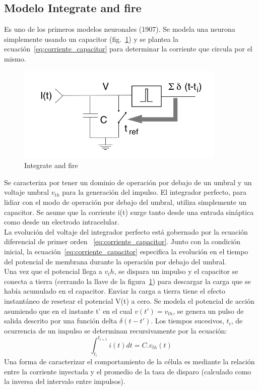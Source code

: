 \subsection{Modelo Integrate and fire}
Es uno de los primeros modelos neuronales (1907). Se modela una neurona simplemente usando un capacitor (fig.~\ref{fig:integrate_and_fire}) y se plantea la ecuación~\ref{eq:corriente_capacitor} para determinar la corriente que circula por el mismo.
\begin{figure}[htbp!]
    \centering
    \includegraphics[width=10cm]{figures/prefect_integrate_and_fire.png}
    \caption{Integrate and fire}
    \label{fig:integrate_and_fire}
\end{figure}
Se caracteriza por tener un dominio de operación por debajo de un umbral y un voltaje umbral $v_{th}$ para la generación del impulso. El integrador perfecto, para lidiar con el modo de operación por debajo del umbral, utiliza simplemente un capacitor. Se asume que la corriente i(t) surge tanto desde una entrada sináptica como desde un electrodo intracelular.\\
La evolución del voltaje del integrador perfecto está gobernado por la ecuación diferencial de primer orden ~\ref{eq:corriente_capacitor}. Junto con la condición inicial, la ecuación~\ref{eq:corriente_capacitor} especifica la evolución en el tiempo del potencial de membrana durante la operación por debajo del umbral.\\
Una vez que el potencial llega a $v_th$, se dispara un impulso y el capacitor se conecta a tierra (cerrando la llave de la figura~\ref{fig:integrate_and_fire}) para descargar la carga que se había acumulado en el capacitor. Enviar la carga a tierra tiene el efecto instantáneo de resetear el potencial V(t) a cero. Se modela el potencial de acción asumiendo que en el instante t' en el cual $v(t')=v_{th}$, se genera un pulso de salida descrito por una función delta $\delta(t-t')$. Los tiempos sucesivos, $t_i$, de ocurrencia de un impulso se determinan recursivamente por la ecuación:
\[\int_{t_i}^{t_{i+1}} i(t) dt = C.v_{th}(t)\]
Una forma de caracterizar el comportamiento de la célula es mediante la relación entre la corriente inyectada y el promedio de la tasa de disparo (calculado como la inversa del intervalo entre impulsos).\\
